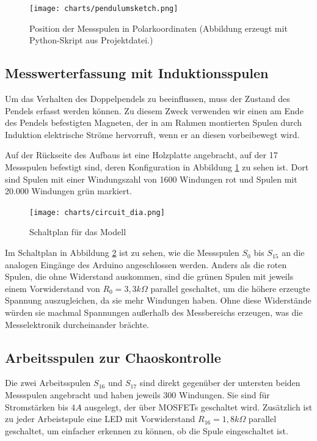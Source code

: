 \begin{figure}[bht]
  \texttt{[image: charts/pendulumsketch.png]}
  \caption{Position der Messspulen in Polarkoordinaten (Abbildung erzeugt mit Python-Skript aus Projektdatei.)}
  \label{fig:pendulumsketch}
\end{figure}

\subsection{Messwerterfassung mit Induktionsspulen}

Um das Verhalten des Doppelpendels zu beeinflussen, muss der Zustand des Pendels erfasst werden können.
Zu diesem Zweck verwenden wir einen am Ende des Pendels befestigten Magneten, der in am Rahmen montierten Spulen durch Induktion elektrische Ströme hervorruft, wenn er an diesen vorbeibewegt wird.

Auf der Rückseite des Aufbaus ist eine Holzplatte angebracht, auf der 17 Messspulen befestigt sind, deren Konfiguration in Abbildung \ref{fig:pendulumsketch} zu sehen ist.
Dort sind Spulen mit einer Windungszahl von 1600 Windungen rot und Spulen mit 20.000 Windungen grün markiert.

\begin{figure}[bht]
  \texttt{[image: charts/circuit\_dia.png]}
  \caption{Schaltplan für das Modell}
  \label{fig:circuit}
\end{figure}

Im Schaltplan in Abbildung \ref{fig:circuit} ist zu sehen, wie die Messspulen $S_0$ bis $S_{15}$ an die analogen Eingänge des Arduino angeschlossen werden.
Anders als die roten Spulen, die ohne Widerstand auskommen, sind die grünen Spulen mit jeweils einem Vorwiderstand von $R_0 = 3,3 k\Omega$ parallel geschaltet, um die höhere erzeugte Spannung auszugleichen, da sie mehr Windungen haben.
Ohne diese Widerstände würden sie machmal Spannungen außerhalb des Messbereichs erzeugen, was die Messelektronik durcheinander brächte.

\subsection{Arbeitsspulen zur Chaoskontrolle}

Die zwei Arbeitsspulen $S_{16}$ und $S_{17}$ sind direkt gegenüber der untersten beiden Messspulen angebracht und haben jeweils 300 Windungen.
Sie sind für Stromstärken bis $4A$ ausgelegt, der über MOSFETs geschaltet wird.
Zusätzlich ist zu jeder Arbeistspule eine LED mit Vorwiderstand $R_{16} = 1,8 k\Omega$ parallel geschaltet, um einfacher erkennen zu können, ob die Spule eingeschaltet ist.


